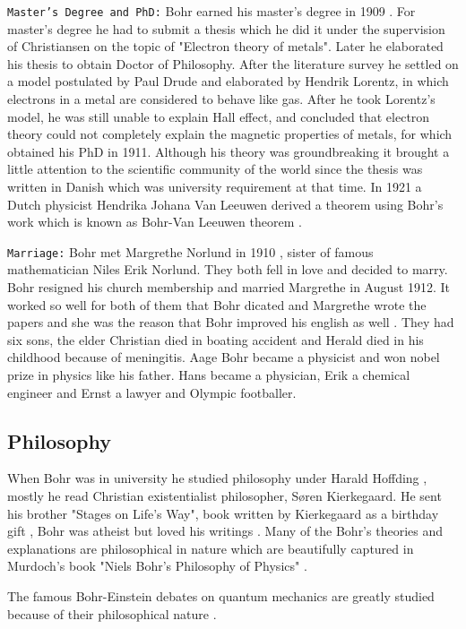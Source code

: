 \documentclass[11pt, article]{scrartcl}
\begin{document}
\texttt{Master's Degree and PhD:}
 Bohr earned his master's degree in 1909 \cite{kennedy}. For master's degree he had to submit a thesis which he did it under the supervision of Christiansen
 on the topic of "Electron theory of metals". Later he elaborated his thesis to obtain Doctor of Philosophy. After the literature survey he settled on a model postulated by Paul Drude
 and elaborated by Hendrik Lorentz, in which electrons in a metal are considered to behave like gas. After he took Lorentz's model, he was still unable to explain Hall effect,
 and concluded that electron theory could not completely explain the magnetic properties of metals, for which obtained his PhD in 1911. Although his theory was groundbreaking it brought a 
 little attention to the scientific community of the world since the thesis was written in Danish which was university requirement at that time. In 1921 a Dutch physicist Hendrika Johana Van 
 Leeuwen derived a theorem using Bohr's work which is known as Bohr-Van Leeuwen theorem \cite{bomb2}.

 \texttt{Marriage:}
 Bohr met Margrethe Norlund in 1910 \cite{student}, sister of famous mathematician Niles Erik Norlund. They both fell in love and decided to marry. Bohr resigned his church membership and married Margrethe 
 in August 1912. It worked so well for both of them that Bohr dicated and Margrethe wrote the papers and she was the reason that Bohr improved his english as well \cite{atom}. They had six sons, the elder Christian died in boating accident and Herald died in his childhood because of meningitis. Aage Bohr became a physicist and won nobel prize 
 in physics like his father. Hans became a physician, Erik a chemical engineer and Ernst a lawyer and Olympic footballer. 

\subsection {Philosophy}
	When Bohr was in university he studied philosophy under Harald Hoffding \cite{phil}, mostly he read Christian existentialist philosopher, Søren Kierkegaard. 
	He sent his brother "Stages on Life's Way", book written by Kierkegaard as a birthday gift \cite{hoffding}, Bohr was atheist but loved his writings \cite{atheist}.
	Many of the Bohr's theories and explanations are philosophical in nature which are beautifully captured in Murdoch's book "Niels Bohr's Philosophy of Physics" \cite{phyphil}. 
	
	The famous Bohr-Einstein debates on quantum mechanics are greatly studied because of their philosophical nature \cite{debate}. 
\end{document}
